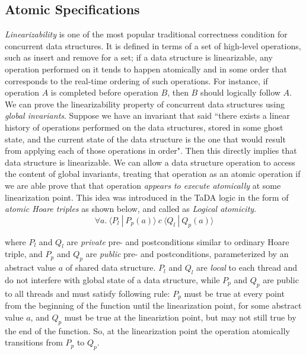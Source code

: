\documentclass[acmsmall,screen]{acmart}\settopmatter{printfolios=true}
\begin{document}
\subsection{Atomic Specifications}
\emph{Linearizability} is one of the most popular traditional correctness condition for concurrent data structures. It is defined in terms of a set of high-level operations, such as insert and remove for a set; if a data structure is linearizable, any operation performed on it tends to happen atomically and in some order that corresponds to the real-time ordering of such operations. For instance, if operation $A$ is completed before operation $B$, then $B$ should logically follow $A$. We can prove the linearizability property of concurrent data structures using \emph{global invariants}. Suppose we have an invariant that said ``there exists a linear history of operations performed on the data structures, stored in some ghost state, and the current  state of the data structure is the one that would result from applying each of those operations in order". Then this directly implies that data structure is linearizable. We can allow a data structure operation to access the content of global invariants, treating that operation as an atomic operation if we are able prove that that operation \emph{appears to execute atomically} at some linearization point. This idea was introduced in the TaDA logic \cite{tada} in the form of \emph{atomic Hoare triples} as shown below, and called as  \emph{Logical atomicity}.    
$$\forall a.\ \langle P_l\ |\ P_p(a)\rangle\ c\ \langle Q_l\ |\ Q_p(a)\rangle$$

where $P_l$ and $Q_l$ are \emph{private} pre- and postconditions similar to ordinary Hoare triple, and $P_p$ and $Q_p$ are \emph{public} pre- and postconditions, parameterized by an abstract value $a$ of shared data structure. $P_l$ and $Q_l$ are \emph{local} to each thread 
and do not interfere with global state of a data structure, while $P_p$ and $Q_p$ are public to all threads and must satisfy following rule: $P_p$ must be true at every point from the beginning of the function until the linearization point, for some abstract value $a$, and $Q_p$ must be true at the lineariztion point, but may not still true by the end of the function. So, at the linearization point the operation atomically transitions from $P_p$ to $Q_p$.
\end{document}
